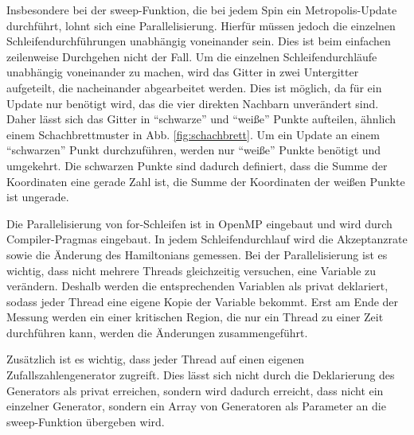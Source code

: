	Insbesondere bei der sweep-Funktion, die bei jedem Spin ein Metropolis-Update durchführt, lohnt sich eine Parallelisierung. Hierfür müssen jedoch die einzelnen Schleifendurchführungen unabhängig voneinander sein. Dies ist beim einfachen zeilenweise Durchgehen nicht der Fall.
	Um die einzelnen Schleifendurchläufe unabhängig voneinander zu machen, wird das Gitter in zwei Untergitter aufgeteilt, die nacheinander abgearbeitet werden. Dies ist möglich, da für ein Update nur benötigt wird, das die vier direkten Nachbarn unverändert sind. Daher lässt sich das Gitter in \enquote{schwarze}
	und \enquote{weiße} Punkte aufteilen, ähnlich einem Schachbrettmuster in Abb. \ref{fig:schachbrett}. Um ein Update an einem \enquote{schwarzen} Punkt durchzuführen, werden nur \enquote{weiße} Punkte benötigt und umgekehrt. Die schwarzen Punkte sind dadurch definiert, dass die Summe der Koordinaten eine gerade Zahl ist, die Summe der Koordinaten der weißen Punkte ist ungerade.
	
	Die Parallelisierung von for-Schleifen ist in OpenMP eingebaut und wird durch Compiler-Pragmas eingebaut. In jedem Schleifendurchlauf wird die Akzeptanzrate sowie die Änderung des Hamiltonians gemessen. Bei der Parallelisierung ist es wichtig, dass nicht mehrere Threads gleichzeitig versuchen, eine Variable zu verändern. Deshalb werden die entsprechenden Variablen als privat deklariert, sodass jeder Thread eine eigene Kopie der Variable bekommt. Erst am Ende der Messung werden ein einer kritischen Region, die nur ein Thread zu einer Zeit durchführen kann, werden die Änderungen zusammengeführt. 	%
	
	
	Zusätzlich ist es wichtig, dass jeder Thread auf einen eigenen Zufallszahlengenerator zugreift. Dies lässt sich nicht durch die Deklarierung des Generators als privat erreichen, sondern wird dadurch erreicht, dass nicht ein einzelner Generator, sondern ein Array von Generatoren als Parameter an die sweep-Funktion übergeben wird.
	
